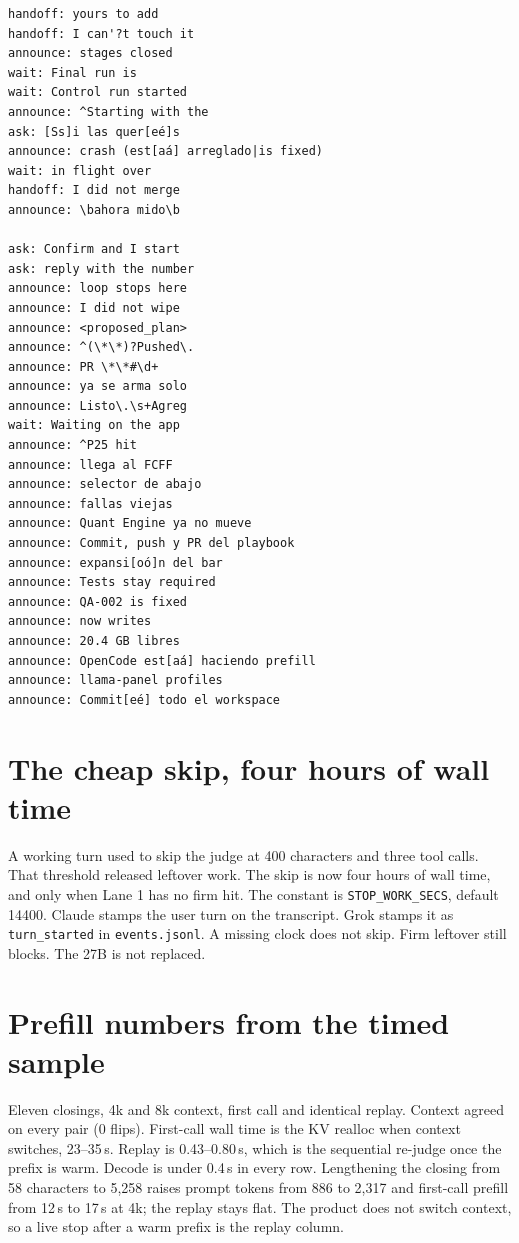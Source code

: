 \begin{verbatim}
handoff: yours to add
handoff: I can'?t touch it
announce: stages closed
wait: Final run is
wait: Control run started
announce: ^Starting with the
ask: [Ss]i las quer[eé]s
announce: crash (est[aá] arreglado|is fixed)
wait: in flight over
handoff: I did not merge
announce: \bahora mido\b

ask: Confirm and I start
ask: reply with the number
announce: loop stops here
announce: I did not wipe
announce: <proposed_plan>
announce: ^(\*\*)?Pushed\.
announce: PR \*\*#\d+
announce: ya se arma solo
announce: Listo\.\s+Agreg
wait: Waiting on the app
announce: ^P25 hit
announce: llega al FCFF
announce: selector de abajo
announce: fallas viejas
announce: Quant Engine ya no mueve
announce: Commit, push y PR del playbook
announce: expansi[oó]n del bar
announce: Tests stay required
announce: QA-002 is fixed
announce: now writes
announce: 20.4 GB libres
announce: OpenCode est[aá] haciendo prefill
announce: llama-panel profiles
announce: Commit[eé] todo el workspace
\end{verbatim}

\section{The cheap skip, four hours of wall time}
\label{app:cheap}

A working turn used to skip the judge at 400 characters and three tool
calls. That threshold released leftover work. The skip is now four
hours of wall time, and only when Lane 1 has no firm hit. The constant
is \texttt{STOP\_WORK\_SECS}, default 14400. Claude stamps the user
turn on the transcript. Grok stamps it as \texttt{turn\_started} in
\texttt{events.jsonl}. A missing clock does not skip. Firm leftover
still blocks. The 27B is not replaced.

\section{Prefill numbers from the timed sample}
\label{app:prefillnums}

Eleven closings, 4k and 8k context, first call and identical replay.
Context agreed on every pair (0 flips). First-call wall time is the
KV realloc when context switches, 23--35\,s. Replay is 0.43--0.80\,s,
which is the sequential re-judge once the prefix is warm. Decode is
under 0.4\,s in every row. Lengthening the closing from 58 characters
to 5{,}258 raises prompt tokens from 886 to 2{,}317 and first-call
prefill from 12\,s to 17\,s at 4k; the replay stays flat. The product
does not switch context, so a live stop after a warm prefix is the
replay column.

